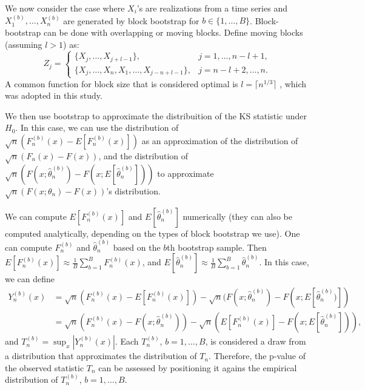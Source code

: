 \documentclass[12pt, titlepage, letterpaper]{article}
\begin{document}
{We now consider the case where $X_i$'s are realizations from a time series and
$X^{(b)}_1,...,X^{(b)}_n$ are generated by block bootstrap for 
$b \in \{1, \ldots, B\}$.  
Block-bootstrap can be done with overlapping or moving blocks.
Define 
moving blocks (assuming $l > 1$) as:
\begin{equation*}
Z_j =
    \begin{cases}
        \{X_j, \ldots, X_{j + l - 1}\}, & j = 1, \dots, n - l + 1,\\
        \{X_j, \ldots, X_n, X_1, \ldots, X_{j-n+l-1}\}, & j = n - l
        + 2 ,\dots, n.
    \end{cases}
\end{equation*}
A common 
function for block size that is considered optimal is 
$l = \lceil n^{1/3} \rceil$ \citep{buhlmann1999block},  
which was adopted in this study.


We then use bootstrap to approximate the distribuition of
the KS statistic under $H_0$. In this case, we can 
use the distribution of $\sqrt{n}(F^{(b)}_n(x) - E[F^{(b)}_n(x)])$
as an approximation of the distribution of
$\sqrt{n}(F_n(x) - F(x))$,
and the distribution of 
$\sqrt{n}(F(x; \hat\theta^{(b)}_n) - F(x; E[\hat\theta^{(b)}_n]))$ to
approximate $\sqrt{n}(F(x; \theta_n) - F(x))$'s distribution.


We can compute $E[F^{(b)}_n(x)]$ and
$E[\hat\theta^{(b)}_n]$ numerically (they can also be computed analytically, 
depending on the types of block bootstrap we use). One can compute 
$F^{(b)}_n$ 
and $\hat\theta^{(b)}_n$ based on
the $b$th bootstrap sample. Then
$E[F^{(b)}_n(x)] \approx \frac{1}{B}\sum_{b = 1}^BF^{(b)}_n(x)$, and
$E[\hat\theta^{(b)}_n] \approx \frac{1}{B}\sum_{b = 1}^B\hat\theta^{(b)}_n$.
In this case, we can define
\begin{align*}
  Y^{(b)}_n(x) &= \sqrt{n}(F^{(b)}_n(x) - E[F^{(b)}_n(x)]) - 
             \sqrt{n}(F(x; \hat\theta^{(b)}_n) - F(x; E[\hat\theta^{(b)}_n)]) \\
           &= \sqrt{n}(F^{(b)}_n(x) - F(x; \hat\theta^{(b)}_n)) -
             \sqrt{n}(E[F^{(b)}_n(x)] - F(x; E[\hat\theta^{(b)}_n])),
\end{align*}
and $T^{(b)}_n = \sup_x|Y^{(b)}_n(x)|$. Each $T_n^{(b)}$,
$b =1, \ldots, B$, is considered a draw from a distribution that approximates
the distribution of $T_n$. Therefore, the p-value of the observed statistic
$T_n$ can be assessed by positioning it agains the empirical distribution of
$T_n^{(b)}$, $b = 1, \ldots, B$.


}
\end{document}
